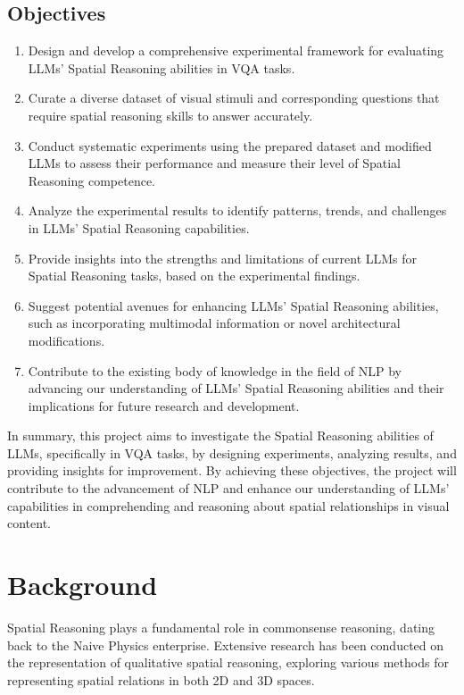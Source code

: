 \documentclass[twocolumn,11pt]{report}
\begin{document}
\section{Objectives}
\begin{enumerate}
    \item Design and develop a comprehensive experimental framework for evaluating LLMs' Spatial Reasoning abilities in VQA tasks.
    \item Curate a diverse dataset of visual stimuli and corresponding questions that require spatial reasoning skills to answer accurately.
    \item Conduct systematic experiments using the prepared dataset and modified LLMs to assess their performance and measure their level of Spatial Reasoning competence.
    \item Analyze the experimental results to identify patterns, trends, and challenges in LLMs' Spatial Reasoning capabilities.
    \item Provide insights into the strengths and limitations of current LLMs for Spatial Reasoning tasks, based on the experimental findings.
    \item Suggest potential avenues for enhancing LLMs' Spatial Reasoning abilities, such as incorporating multimodal information or novel architectural modifications.
    \item Contribute to the existing body of knowledge in the field of NLP by advancing our understanding of LLMs' Spatial Reasoning abilities and their implications for future research and development.
\end{enumerate}

In summary, this project aims to investigate the Spatial Reasoning abilities of LLMs, specifically in VQA tasks, by designing experiments, analyzing results, and providing insights for improvement. By achieving these objectives, the project will contribute to the advancement of NLP and enhance our understanding of LLMs' capabilities in comprehending and reasoning about spatial relationships in visual content.

\chapter{Background}\label{chap:background}
Spatial Reasoning plays a fundamental role in commonsense reasoning, dating back to the Naive Physics enterprise\cite{Hobbs1985-HOBFTO}. Extensive research has been conducted on the representation of qualitative spatial reasoning\cite{chen2015survey}, exploring various methods for representing spatial relations in both 2D and 3D spaces.
\end{document}
